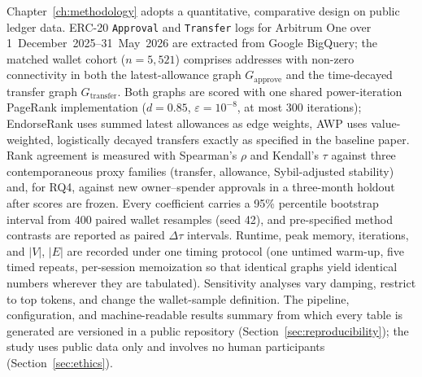Chapter~\ref{ch:methodology} adopts a quantitative, comparative design on public ledger data. ERC-20 \texttt{Approval} and \texttt{Transfer} logs for Arbitrum One over 1~December~2025--31~May~2026 are extracted from Google BigQuery; the matched wallet cohort ($n=5{,}521$) comprises addresses with non-zero connectivity in both the latest-allowance graph $G_{\text{approve}}$ and the time-decayed transfer graph $G_{\text{transfer}}$. Both graphs are scored with one shared power-iteration PageRank implementation ($d=0.85$, $\varepsilon=10^{-8}$, at most 300 iterations); EndorseRank uses summed latest allowances as edge weights, AWP uses value-weighted, logistically decayed transfers exactly as specified in the baseline paper. Rank agreement is measured with Spearman's $\rho$ and Kendall's $\tau$ against three contemporaneous proxy families (transfer, allowance, Sybil-adjusted stability) and, for RQ4, against new owner--spender approvals in a three-month holdout after scores are frozen. Every coefficient carries a 95\% percentile bootstrap interval from 400 paired wallet resamples (seed 42), and pre-specified method contrasts are reported as paired $\Delta\tau$ intervals. Runtime, peak memory, iterations, and $|V|$, $|E|$ are recorded under one timing protocol (one untimed warm-up, five timed repeats, per-session memoization so that identical graphs yield identical numbers wherever they are tabulated). Sensitivity analyses vary damping, restrict to top tokens, and change the wallet-sample definition. The pipeline, configuration, and machine-readable results summary from which every table is generated are versioned in a public repository (Section~\ref{sec:reproducibility}); the study uses public data only and involves no human participants (Section~\ref{sec:ethics}).


